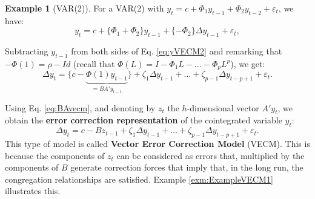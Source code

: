 \documentclass[
  12pt,
]{book}
\theoremstyle{definition}
\theoremstyle{definition}
\newtheorem{example}{Example}[chapter]
\theoremstyle{definition}
\theoremstyle{definition}
\theoremstyle{remark}
\begin{document}
\begin{example}[VAR(2)]
\protect\hypertarget{exm:vecmVAR2}{}\label{exm:vecmVAR2}For a VAR(2) with \(y_t = c + \Phi_1 y_{t-1}+ \Phi_2 y_{t-2} + \varepsilon_t\), we have:
\[
y_t = c + \{\Phi_1 + \Phi_2\} y_{t-1} + \{-\Phi_2\} \Delta y_{t-1} + \varepsilon_t,
\]
\end{example}

Subtracting \(y_{t-1}\) from both sides of Eq. \eqref{eq:yVECM2} and remarking that \(-\Phi(1) = \rho - Id\) (recall that \(\Phi(L) = I - \Phi_1 L - \dots - \Phi_p L^p\)), we get:
\[
\Delta y_t = \{c - \underbrace{\Phi(1) y_{t-1}}_{=BA'y_{t-1}}\} + \zeta_1 \Delta y_{t-1} + \dots + \zeta_{p-1} \Delta y_{t-p+1} + \varepsilon_t.
\]

Using Eq. \eqref{eq:BAvecm}, and denoting by \(z_t\) the \(h\)-dimensional vector \(A'y_{t}\), we obtain the \textbf{error correction representation} of the cointegrated variable \(y_t\):
\begin{equation}
\boxed{\Delta y_t = c - B z_{t-1} + \zeta_1 \Delta y_{t-1} + \dots + \zeta_{p-1} \Delta y_{t-p+1} + \varepsilon_t.}\label{eq:VECM3}
\end{equation}
This type of model is called \textbf{Vector Error Correction Model} (VECM). This is because the components of \(z_t\) can be considered as errors that, multiplied by the components of \(B\) generate correction forces that imply that, in the long run, the congregation relationships are satisfied. Example \ref{exm:ExampleVECM1} illustrates this.
\end{document}
